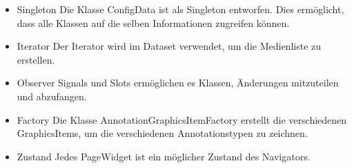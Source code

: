\begin{itemize}
\item Singleton \linebreak
	Die Klasse ConfigData ist als Singleton entworfen. Dies ermöglicht, dass alle Klassen auf die selben Informationen zugreifen können.
	
\item Iterator \linebreak
	Der Iterator wird im Dataset verwendet, um die Medienliste zu erstellen.
	
\item Observer \linebreak
	Signals und Slots ermöglichen es Klassen, Änderungen mitzuteilen und abzufangen.
	
\item Factory \linebreak
	Die Klasse AnnotationGraphicsItemFactory erstellt die verschiedenen GraphicsItems, um die verschiedenen Annotationstypen zu zeichnen.
	
\item Zustand \linebreak
	Jedes PageWidget ist ein möglicher Zustand des Navigators.
\end{itemize}
